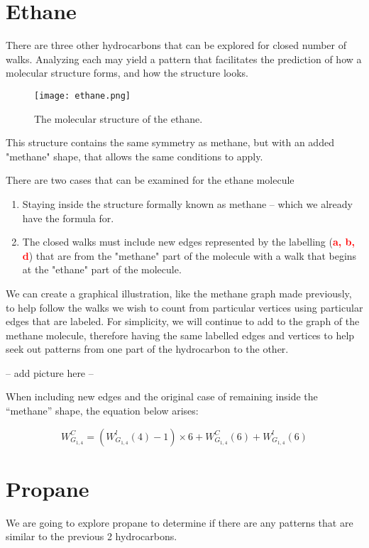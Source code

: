 \section{Ethane}
There are three other hydrocarbons that can be explored for closed number of walks.  Analyzing each may yield a pattern that facilitates the prediction of how a molecular structure forms, and how the structure looks. \\
    \par

    \begin{figure}
        \begin{center}
    \texttt{[image: ethane.png]}
    \end{center}
    \caption{\small{The molecular structure of the ethane.}}
    \end{figure}
This structure contains the same symmetry as methane, but with an added "methane" shape, that allows the same conditions to apply. 
\\
\par
There are two cases that can be examined for the ethane molecule
\begin{enumerate}
    \item Staying inside the structure formally known as methane -- which we already have the formula for. 
    \item The closed walks must include new edges represented by the labelling (\textbf{\textcolor{red}{a, b, d}}) that are from the "methane" part of the molecule with a walk that begins at the "ethane" part of the molecule.
\end{enumerate}
     We can create a graphical illustration, like the methane graph made previously, to help follow the walks we wish to count from particular vertices using particular edges that are labeled.  For simplicity, we will continue to add to the graph of the methane molecule, therefore having the same labelled edges and vertices to help seek out patterns from one part of the hydrocarbon to the other.

-- add picture here -- 

When including new edges and the original case of remaining inside the ``methane'' shape, the equation below arises:

\begin{equation}
    W^C_{G_{1,4}} = (W^l_{G_{1,4}}(4)-1) \times 6 +W^C_{G_{1,4}}(6)+W^l_{G_{1,4}}(6)
\end{equation}

\section{Propane}
We are going to explore propane to determine if there are any patterns that are similar to the previous 2 hydrocarbons.\\

